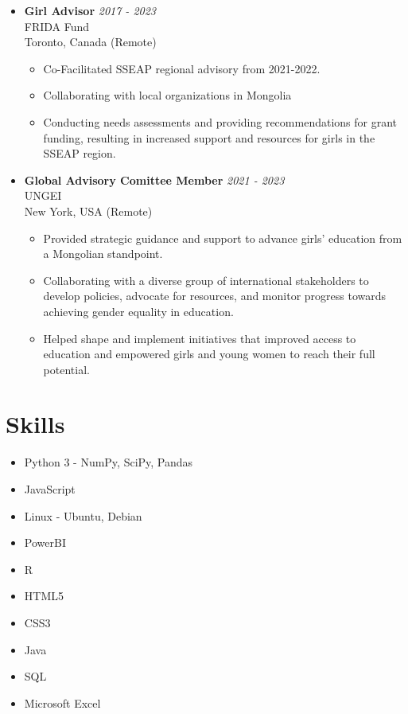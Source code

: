 \documentclass[11pt,a4paper]{article}
\begin{document}
\begin{itemize}
    \item \textbf{Girl Advisor} \hfill \textit{2017 - 2023} \\
    FRIDA Fund \\ 
    Toronto, Canada (Remote)
    \begin{itemize}
        \item Co-Facilitated SSEAP regional advisory from 2021-2022.
        \item Collaborating with local organizations in Mongolia
        \item Conducting needs assessments and providing recommendations for grant funding, resulting in increased support and resources for girls in the SSEAP region.
    \end{itemize}

    \item \textbf{Global Advisory Comittee Member} \hfill \textit{2021 - 2023} \\
    UNGEI \\
    New York, USA (Remote)
    \begin{itemize}
        \item Provided strategic guidance and support to advance girls' education from a Mongolian standpoint.
        \item Collaborating with a diverse group of international stakeholders to develop policies, advocate for resources, and monitor progress towards achieving gender equality in education.
        \item Helped shape and implement initiatives that improved access to education and empowered girls and young women to reach their full potential.
    \end{itemize}
\end{itemize}


\section*{Skills}

\begin{multicols}{2}
\begin{itemize}
    \item Python 3 - NumPy, SciPy, Pandas
    \item JavaScript
    \item Linux - Ubuntu, Debian
    \item PowerBI
    \item R
    \item HTML5
    \item CSS3
    \item Java
    \item SQL
    \item Microsoft Excel
\end{itemize}
\end{multicols}
\end{document}
